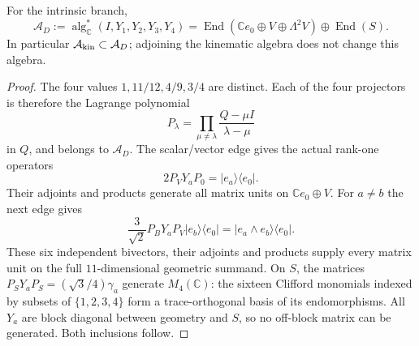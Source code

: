 \documentclass[11pt]{article}
\begin{document}
\begin{theorem}\label{p1:thm:v226-coordinate-only}
For the intrinsic branch,
\[
 \mathcal A_D:=\operatorname{alg}_\mathbb{C}^*(I,Y_1,Y_2,Y_3,Y_4)
 =\operatorname{End}(\mathbb{C} e_0\oplus V\oplus\Lambda^2V)\oplus\operatorname{End}(S).
\]
In particular $\mathcal A_{\rm kin}\subset\mathcal A_D$; adjoining the
kinematic algebra does not change this algebra.
\end{theorem}
\begin{proof}
The four values $1,11/12,4/9,3/4$ are distinct. Each of the four projectors
is therefore the Lagrange polynomial
\begin{equation}\label{p1:eq:v226-projector}
 P_\lambda=\prod_{\mu\ne\lambda}\frac{Q-\mu I}{\lambda-\mu}
\end{equation}
in $Q$, and belongs to $\mathcal A_D$.
The scalar/vector edge gives the actual rank-one operators
\[
 2P_VY_aP_0=|e_a\rangle\langle e_0|.
\]
Their adjoints and products generate all matrix units on $\mathbb{C} e_0\oplus V$.
For $a\ne b$ the next edge gives
\[
 \frac{3}{\sqrt2}P_BY_aP_V|e_b\rangle\langle e_0|
 =|e_a\wedge e_b\rangle\langle e_0|.
\]
These six independent bivectors, their adjoints and products supply every
matrix unit on the full $11$-dimensional geometric summand. On $S$, the
matrices $P_SY_aP_S=(\sqrt3/4)\gamma_a$ generate $M_4(\mathbb{C})$: the sixteen
Clifford monomials indexed by subsets of $\{1,2,3,4\}$ form a trace-orthogonal
basis of its endomorphisms. All $Y_a$ are block diagonal between geometry
and $S$, so no off-block matrix can be generated. Both inclusions follow.
\end{proof}
\end{document}
